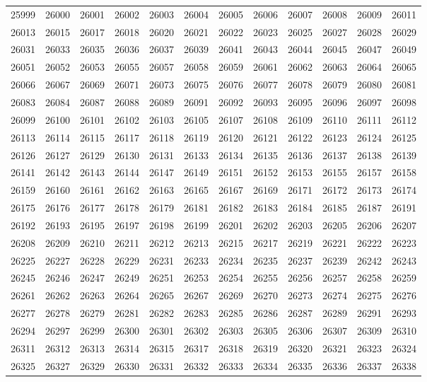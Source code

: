 \begin{center}
\begin{longtable}{llllllllllll}
25999 &26000 &26001 &26002 &26003 &26004 &26005 &26006 &26007 &26008 &26009 &26011 \\
26013 &26015 &26017 &26018 &26020 &26021 &26022 &26023 &26025 &26027 &26028 &26029 \\
26031 &26033 &26035 &26036 &26037 &26039 &26041 &26043 &26044 &26045 &26047 &26049 \\
26051 &26052 &26053 &26055 &26057 &26058 &26059 &26061 &26062 &26063 &26064 &26065 \\
26066 &26067 &26069 &26071 &26073 &26075 &26076 &26077 &26078 &26079 &26080 &26081 \\
26083 &26084 &26087 &26088 &26089 &26091 &26092 &26093 &26095 &26096 &26097 &26098 \\
26099 &26100 &26101 &26102 &26103 &26105 &26107 &26108 &26109 &26110 &26111 &26112 \\
26113 &26114 &26115 &26117 &26118 &26119 &26120 &26121 &26122 &26123 &26124 &26125 \\
26126 &26127 &26129 &26130 &26131 &26133 &26134 &26135 &26136 &26137 &26138 &26139 \\
26141 &26142 &26143 &26144 &26147 &26149 &26151 &26152 &26153 &26155 &26157 &26158 \\
26159 &26160 &26161 &26162 &26163 &26165 &26167 &26169 &26171 &26172 &26173 &26174 \\
26175 &26176 &26177 &26178 &26179 &26181 &26182 &26183 &26184 &26185 &26187 &26191 \\
26192 &26193 &26195 &26197 &26198 &26199 &26201 &26202 &26203 &26205 &26206 &26207 \\
26208 &26209 &26210 &26211 &26212 &26213 &26215 &26217 &26219 &26221 &26222 &26223 \\
26225 &26227 &26228 &26229 &26231 &26233 &26234 &26235 &26237 &26239 &26242 &26243 \\
26245 &26246 &26247 &26249 &26251 &26253 &26254 &26255 &26256 &26257 &26258 &26259 \\
26261 &26262 &26263 &26264 &26265 &26267 &26269 &26270 &26273 &26274 &26275 &26276 \\
26277 &26278 &26279 &26281 &26282 &26283 &26285 &26286 &26287 &26289 &26291 &26293 \\
26294 &26297 &26299 &26300 &26301 &26302 &26303 &26305 &26306 &26307 &26309 &26310 \\
26311 &26312 &26313 &26314 &26315 &26317 &26318 &26319 &26320 &26321 &26323 &26324 \\
26325 &26327 &26329 &26330 &26331 &26332 &26333 &26334 &26335 &26336 &26337 &26338 \\

\end{longtable}
\end{center}
